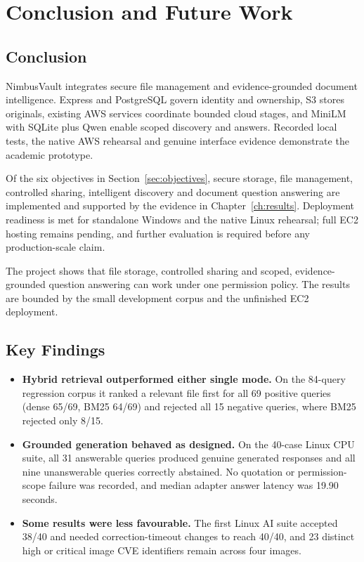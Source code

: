\chapter{Conclusion and Future Work}

\section{Conclusion}

NimbusVault integrates secure file management and evidence-grounded document intelligence. Express and PostgreSQL govern identity and ownership, S3 stores originals, existing AWS services coordinate bounded cloud stages, and MiniLM with SQLite plus Qwen enable scoped discovery and answers. Recorded local tests, the native AWS rehearsal and genuine interface evidence demonstrate the academic prototype.

Of the six objectives in Section~\ref{sec:objectives}, secure storage, file management, controlled sharing, intelligent discovery and document question answering are implemented and supported by the evidence in Chapter~\ref{ch:results}. Deployment readiness is met for standalone Windows and the native Linux rehearsal; full EC2 hosting remains pending, and further evaluation is required before any production-scale claim.

The project shows that file storage, controlled sharing and scoped, evidence-grounded question answering can work under one permission policy. The results are bounded by the small development corpus and the unfinished EC2 deployment.

\section{Key Findings}

\begin{itemize}
  \item \textbf{Hybrid retrieval outperformed either single mode.} On the 84-query regression corpus it ranked a relevant file first for all 69 positive queries (dense 65/69, BM25 64/69) and rejected all 15 negative queries, where BM25 rejected only 8/15.
  \item \textbf{Grounded generation behaved as designed.} On the 40-case Linux CPU suite, all 31 answerable queries produced genuine generated responses and all nine unanswerable queries correctly abstained. No quotation or permission-scope failure was recorded, and median adapter answer latency was 19.90 seconds.
  \item \textbf{Some results were less favourable.} The first Linux AI suite accepted 38/40 and needed correction-timeout changes to reach 40/40, and 23 distinct high or critical image CVE identifiers remain across four images.
\end{itemize}


